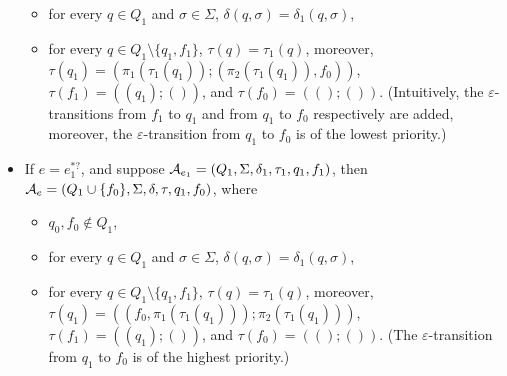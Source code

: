 \begin{itemize}
\begin{itemize}
    \item for every $q \in Q_1$ and $\sigma \in \Sigma$, $\delta(q, \sigma) = \delta_1(q, \sigma)$, 
    
    \item for every $q \in Q_1 \setminus \{q_1, f_1\}$,  $\tau(q) = \tau_1(q)$, moreover, $\tau(q_1) = (\pi_1(\tau_1(q_1)); (\pi_2(\tau_1(q_1)), f_0))$, $\tau(f_1) = ((q_1); ())$, and $\tau(f_0) = ((); ())$. (Intuitively, the $\varepsilon$-transitions from $f_1$ to $q_1$ and from $q_1$ to $f_0$ respectively are added, moreover, the $\varepsilon$-transition from $q_1$ to $f_0$ is of the lowest priority.)
  \end{itemize}
  \item If $e = e_1^{\ast?}$, and suppose $\mathcal{A}_{e_1} = (Q_1,
  \Sigma, \delta_1, \tau_1, q_1, f_1)$, then $\mathcal{A}_e = (Q_1 \cup \{f_0\}, \Sigma,
  \delta, \tau, q_1, f_0)$, where 
  \begin{itemize}
  \item $q_0, f_0 \not \in Q_1$,
  
    \item for every $q \in Q_1$ and $\sigma \in \Sigma$, $\delta(q, \sigma) = \delta_1(q, \sigma)$, 
    
    \item for every $q \in Q_1 \setminus \{q_1, f_1\}$,  $\tau(q) = \tau_1(q)$, moreover, $\tau(q_1) = ((f_0, \pi_1(\tau_1(q_1))); \pi_2(\tau_1(q_1)))$, $\tau(f_1) = ((q_1); ())$, and $\tau(f_0) = ((); ())$. (The $\varepsilon$-transition from $q_1$ to $f_0$ is of the highest priority.)
  \end{itemize}  
\end{itemize}



